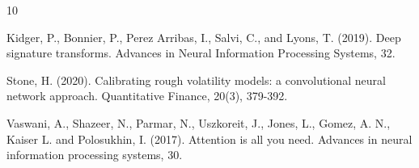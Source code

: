 \documentclass[]{article}
\renewcommand{\(}{\left(}
\renewcommand{\)}{\right)}
\begin{document}
	
	\begin{thebibliography}{10}
		
		Kidger, P., Bonnier, P., Perez Arribas, I., Salvi, C., and Lyons, T. (2019). Deep signature transforms. Advances in Neural Information Processing Systems, 32.
		
		
		Stone, H. (2020). Calibrating rough volatility models: a convolutional neural network approach. Quantitative Finance, 20(3), 379-392.
		
		Vaswani, A., Shazeer, N., Parmar, N., Uszkoreit, J., Jones, L., Gomez, A. N., Kaiser L. and Polosukhin, I. (2017). Attention is all you need. Advances in neural information processing systems, 30.
		
	\end{thebibliography}
	\appendix
\end{document}
